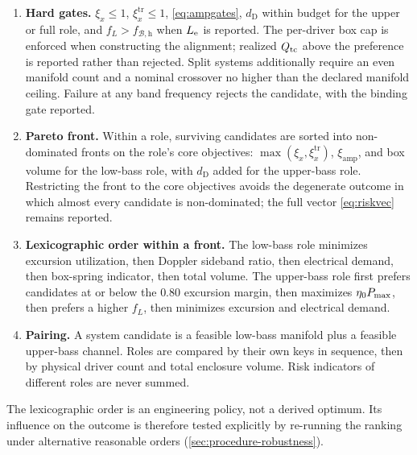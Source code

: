 \begin{enumerate}
\item \textbf{Hard gates.} $\xi_x\le1$, $\xi_x^{\mathrm{tr}}\le1$,
	\cref{eq:ampgates}, $d_{\mathrm D}$ within budget for the upper or full
	role, and $f_L>f_{\mathcal B,\mathrm h}$ when $L_{\mathrm{e}}$ is reported.
	The per-driver box cap is enforced when constructing the alignment;
	realized $Q_{\mathrm{tc}}$ above the preference is reported rather than rejected.
	Split systems additionally require an even manifold count and a nominal
	crossover no higher than the declared manifold ceiling. Failure at any
	band frequency rejects the candidate, with the binding gate reported.
\item \textbf{Pareto front.} Within a role, surviving candidates are sorted
	into non-dominated fronts on the role's core objectives:
	$\max(\xi_x,\xi_x^{\mathrm{tr}})$, $\xi_{\mathrm{amp}}$, and box volume
	for the low-bass role, with $d_{\mathrm D}$ added for the upper-bass
	role. Restricting the front to the core objectives avoids the degenerate
	outcome in which almost every candidate is non-dominated; the full
	vector \cref{eq:riskvec} remains reported.
\item \textbf{Lexicographic order within a front.} The low-bass role
	minimizes excursion utilization, then Doppler sideband ratio, then
	electrical demand, then box-spring indicator, then total volume. The upper-bass
	role first prefers candidates at or below the $0.80$ excursion margin,
	then maximizes $\eta_0P_{\mathrm{max}}$, then prefers a higher $f_L$, then
	minimizes excursion and electrical demand.
\item \textbf{Pairing.} A system candidate is a feasible low-bass manifold
	plus a feasible upper-bass channel. Roles are compared by their own keys
	in sequence, then by physical driver count and total enclosure volume.
	Risk indicators of different roles are never summed.
\end{enumerate}

The lexicographic order is an engineering policy, not a derived optimum.
Its influence on the outcome is therefore tested explicitly by re-running
the ranking under alternative reasonable orders
(\cref{sec:procedure-robustness}).
